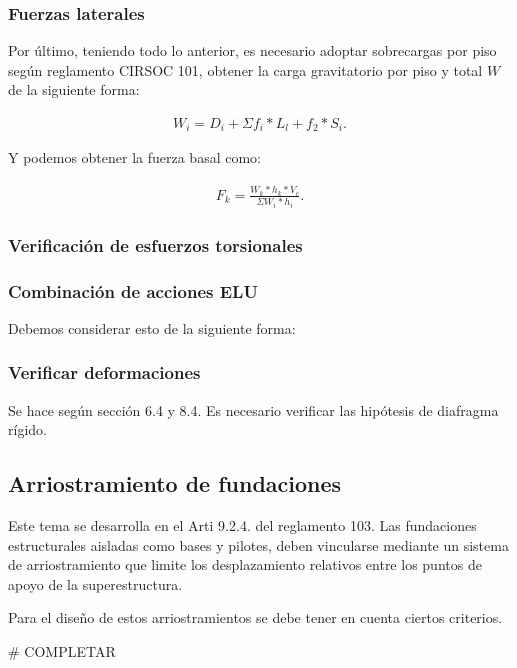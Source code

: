 \documentclass[../main.tex]{subfiles}
\begin{document}
\subsubsection{Fuerzas laterales}

Por último, teniendo todo lo anterior, es necesario adoptar sobrecargas por piso
según reglamento CIRSOC 101, obtener la carga gravitatorio por piso y total $W$ 
de la siguiente forma:

 \begin{align*}
  W_i = D_i + \Sigma f_i * L_l + f_2 * S_i 
.\end{align*}

Y podemos obtener la fuerza basal como:

\begin{align*}
  F_k = \frac{W_k*h_k*V_c}{\Sigma W_i*h_i}
.\end{align*}

\subsubsection{Verificación de esfuerzos torsionales}


\subsubsection{Combinación de acciones ELU}

Debemos considerar esto de la siguiente forma:


\subsubsection{Verificar deformaciones}

Se hace según sección 6.4 y 8.4.
Es necesario verificar las hipótesis de diafragma rígido.


\subsection{Arriostramiento de fundaciones}
Este tema se desarrolla en el Arti 9.2.4. del reglamento 103. Las fundaciones
estructurales aisladas como bases y pilotes, deben vincularse mediante un sistema
de arriostramiento que limite los desplazamiento relativos entre los puntos
de apoyo de la superestructura.

Para el diseño de estos arriostramientos se debe tener en cuenta ciertos criterios.

# COMPLETAR
\end{document}
